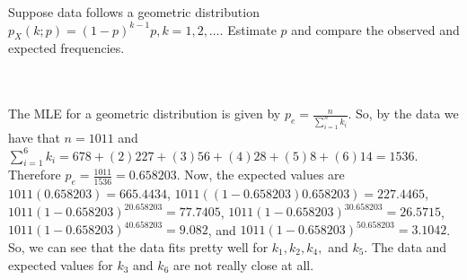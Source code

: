 Suppose data follows a geometric distribution $p_X(k;p)=(1-p)^{k-1}p, k=1,2,\dotsc$. Estimate $p$ and
compare the observed and expected frequencies.\\\\

\begin{solution}\renewcommand{\qedsymbol}{}\ \\
    The MLE for a geometric distribution is given by $p_e=\frac{n}{\sum_{i=1}^nk_i}$. So, by the data we
    have that $n=1011$ and $\sum_{i=1}^6k_i=678+(2)227+(3)56+(4)28+(5)8+(6)14=1536$. Therefore
    $p_e=\frac{1011}{1536}=0.658203$. Now, the expected values are
    $1011(0.658203)=665.4434$, $1011((1-0.658203)0.658203)=227.4465$,
    $1011(1-0.658203)^20.658203=77.7405$, $1011(1-0.658203)^30.658203=26.5715$,
    $1011(1-0.658203)^40.658203=9.082$, and $1011(1-0.658203)^50.658203=3.1042$. So, we can see that the
    data fits pretty well for $k_1, k_2, k_4,$ and $k_5$. The data and expected values for $k_3$ and
    $k_6$ are not really close at all.

\end{solution}